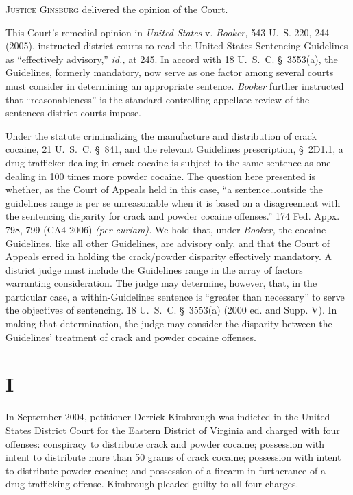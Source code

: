 
\setcounter{page}{90}

  \textsc{Justice Ginsburg} delivered the opinion of the Court.

  This Court's remedial opinion in \emph{United States} v. \emph{Booker,}
543 U.~S. 220, 244 (2005), instructed district courts to read the
United States Sentencing Guidelines as ``effectively advisory,''
\emph{id.,} at 245. In accord with 18 U.~S.~C. \S~3553(a), the
Guidelines, formerly mandatory, now serve as one factor among several
courts must consider in determining an appropriate sentence. \emph{Booker}
further instructed that ``reason\newpage ableness'' is the standard
controlling appellate review of the sentences district courts impose.

  Under the statute criminalizing the manufacture and distribution of
crack cocaine, 21 U.~S.~C. \S~841, and the relevant Guidelines
prescription, \S~2D1.1, a drug trafficker dealing in crack cocaine is
subject to the same sentence as one dealing in 100 times more powder
cocaine. The question here presented is whether, as the Court of
Appeals held in this case, ``a sentence\dots outside the guidelines
range is per se unreasonable when it is based on a disagreement with
the sentencing disparity for crack and powder cocaine offenses.''
174 Fed. Appx. 798, 799 (CA4 2006) \emph{(per curiam).} We hold that,
under \emph{Booker,} the cocaine Guidelines, like all other Guidelines,
are advisory only, and that the Court of Appeals erred in holding
the crack/powder disparity effectively mandatory. A district judge
must include the Guidelines range in the array of factors warranting
consideration. The judge may determine, however, that, in the particular
case, a within-Guidelines sentence is ``greater than necessary'' to
serve the objectives of sentencing. 18 U.~S.~C. \S~3553(a) (2000
ed. and Supp. V). In making that determination, the judge may consider
the disparity between the Guidelines' treatment of crack and powder
cocaine offenses.

\section{I}

  In September 2004, petitioner Derrick Kimbrough was indicted in the
United States District Court for the Eastern District of Virginia and
charged with four offenses: conspiracy to distribute crack and powder
cocaine; possession with intent to distribute more than 50 grams of
crack cocaine; possession with intent to distribute powder cocaine; and
possession of a firearm in furtherance of a drug-trafficking offense.
Kimbrough pleaded guilty to all four charges.


